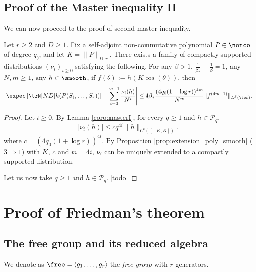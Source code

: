\section{Proof of the Master inequality II}

We can now proceed to the proof of second master inequality.

\begin{theorem}
  \label{thm:masterII}
  Let $r \geq 2$ and $D \geq 1$.
  Fix a self-adjoint non-commutative polynomial $P \in \nonco$
  of degree $q_0$, and let $K = \|P\|_{D,r}$.
  There exists a family of compactly supported distributions $(\nu_i)_{i\geq 0}$
  satisfying the following.
  For any $\beta > 1$, $\frac{1}{\beta_*} + \frac{1}{\beta} = 1$,
  any $N,m \geq 1$, any $h \in \smooth$, if $f(\theta) := h(K\cos(\theta))$, then
  \begin{equation*}
    \left|\expec\left[\trN[ND] h(P(S_1, \ldots, S_r))\right]
     - \sum_{i=0}^{m-1} \frac{\nu_i(h)}{N^i}\right|
     \leq 4 \beta_* \frac{(4 q_0(1+\log r))^{4m}}{N^m} \|f^{(4m+1)}\|_{L^\beta(\tor)}.
  \end{equation*}
\end{theorem}

\begin{proof}
  Let $i \geq 0$.
  By Lemma \ref{coro:masterI},
  for every $q \geq 1$ and $h \in \mathcal{P}_q$,
  \begin{equation*}
    |\nu_i(h)|
    \leq c q^{4i} \|h\|_{C^0([-K,K])}.
  \end{equation*}
  where $c = (4 q_0(1+\log r))^{4i}$.
  By Proposition \ref{prop:extension_poly_smooth} ($3 \Rightarrow 1$)
  with $K$, $c$ and $m=4i$, $\nu_i$ can be uniquely extended to a compactly supported
  distribution.

  Let us now take $q \geq 1$ and $h \in \mathcal{P}_q$. [todo]
\end{proof}


\chapter{Proof of Friedman's theorem}

\section{The free group and its reduced algebra}

\begin{definition}
  \label{def:free_group}
  We denote as $\free = \langle g_1, \ldots, g_r \rangle$ the \emph{free group} with $r$ generators.
\end{definition}

